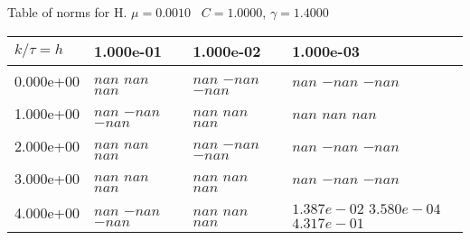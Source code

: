 \begin{center}
Table of norms for H. $\mu = 0.0010$ \, $C = 1.0000$, $\gamma = 1.4000$
  
\begin{tabular}{|p{1in}|p{1in}|p{1in}|p{1in}|} \hline
$k / \tau = h$ &1.000e-01 &1.000e-02 &1.000e-03 \\ \hline 
0.000e+00 & $nan$  $nan$  $nan$  & $nan$  $-nan$  $-nan$  & $nan$  $-nan$  $-nan$  \\ \hline 
1.000e+00 & $nan$  $-nan$  $-nan$  & $nan$  $nan$  $nan$  & $nan$  $nan$  $nan$  \\ \hline 
2.000e+00 & $nan$  $nan$  $nan$  & $nan$  $-nan$  $-nan$  & $nan$  $-nan$  $-nan$  \\ \hline 
3.000e+00 & $nan$  $nan$  $nan$  & $nan$  $nan$  $nan$  & $nan$  $-nan$  $-nan$  \\ \hline 
4.000e+00 & $nan$  $-nan$  $-nan$  & $nan$  $nan$  $nan$  & $1.387e-02$  $3.580e-04$  $4.317e-01$  \\ \hline 

\end{tabular}\\[20pt]
\end{center}
